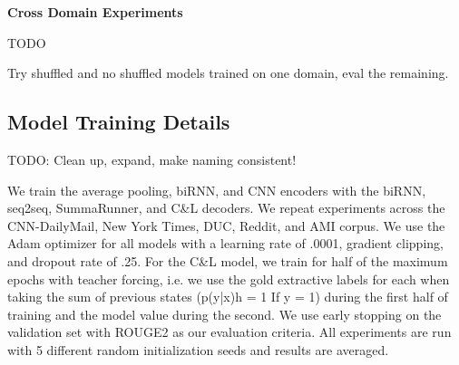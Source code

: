 \textbf{Cross Domain Experiments}

TODO

Try shuffled and no shuffled models trained on one domain, eval the remaining.











\subsection{Model Training Details}

TODO: Clean up, expand, make naming consistent!

We train the average pooling, biRNN, and CNN encoders with the biRNN, 
seq2seq, SummaRunner, and C\&L decoders. We repeat experiments across the 
CNN-DailyMail, New York Times, DUC, Reddit, and AMI corpus. 
We use the Adam optimizer for all models with a learning rate of .0001, 
gradient clipping, and dropout rate of .25. 
For the C\&L model, we train for half of the maximum epochs with teacher 
forcing, i.e. we use the gold extractive labels for each when taking the sum 
of previous states (p(y|x)h = 1 If y = 1) during the first half of training 
and the model value during the second. We use early stopping on the validation
set with ROUGE2 as our evaluation criteria. All experiments are run with 5 
different random initialization seeds and results are averaged.





